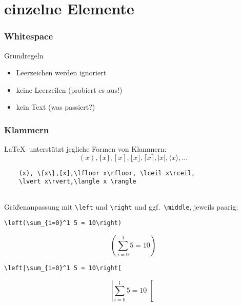 \section{einzelne Elemente}

\begin{frame}[fragile]
  \frametitle {Whitespace}
  \begin{block}{Grundregeln}
    \begin{itemize}
      \item Leerzeichen werden ignoriert
      \item keine Leerzeilen (probiert es aus!)
      \item kein Text (was passiert?)
    \end{itemize}
  \end{block}
\end{frame}
% 

\begin{frame}[fragile]
  \frametitle{Klammern}

  \onslide<+->

  \LaTeX\ unterstützt jegliche Formen von Klammern:
  \begin{equation*}
    (x), \{x\},[x],\lfloor x\rfloor, \lceil x\rceil,\lvert x\rvert,\langle x \rangle,\ldots
  \end{equation*}

  \onslide<+->

  \begin{lstlisting}
    (x), \{x\},[x],\lfloor x\rfloor, \lceil x\rceil,
    \lvert x\rvert,\langle x \rangle
    
  \end{lstlisting}
    
  \medskip

  \onslide<+->

  Größenanpassung mit \lstinline{\left} und \lstinline{\right} und ggf.\ \lstinline|\middle|, jeweils paarig:

\begin{lstlisting}
\left(\sum_{i=0}^1 5 = 10\right)
\end{lstlisting}

  \vspace*{-2ex}

  \begin{equation*}
    \left(\sum_{i=0}^1 5 = 10\right)
  \end{equation*}

  \vspace*{1ex}

  \onslide<+->

\begin{lstlisting}
\left|\sum_{i=0}^1 5 = 10\right[
\end{lstlisting}

  \vspace*{-2ex}

  \begin{equation*}
    \left|\sum_{i=0}^1 5 = 10\right[
  \end{equation*}

\end{frame}

